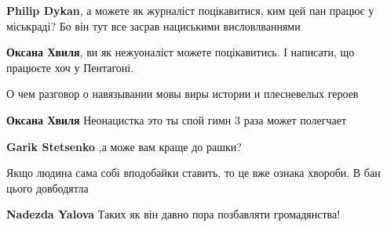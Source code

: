 \begin{itemize}
\begin{itemize}
\textbf{Philip Dykan}, а можете як журналіст поцікавитися, ким цей пан працює у міськраді? Бо він тут все засрав нациськими висловлваннями

 
\textbf{Оксана Хвиля}, ви як нежуоналіст можете поцікавитись. І написати, що працюєте хоч у Пентагоні.

 
О чем разговор о навязывании мовы виры истории и плесневелых героев

 
\textbf{Оксана Хвиля} Неонацистка это ты спой гимн 3 раза может полегчает

 
\textbf{Garik Stetsenko} ,а може вам краще до рашки?

 
Якщо людина сама собі вподобайки ставить, то це вже ознака хвороби. В бан цього довбодятла

 
\textbf{Nadezda Yalova} Таких як він давно пора позбавляти громадянства!


\end{itemize}
\end{itemize}
